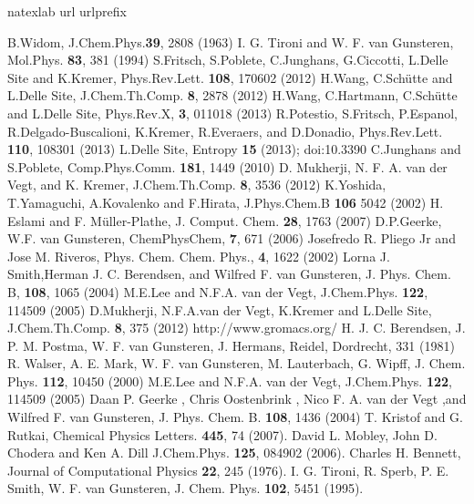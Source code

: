 \documentclass[a4paper,preprint,unsortedaddress]{revtex4-1}
\begin{document}
\begin{thebibliography}{24}
\expandafter\ifx\csname natexlab\endcsname\relax\def\natexlab#1{#1}\fi
\expandafter\ifx\csname url\endcsname\relax
  \def\url#1{\texttt{#1}}\fi
\expandafter\ifx\csname urlprefix\endcsname\relax\def\urlprefix{URL }\fi

B.Widom, J.Chem.Phys.{\bf 39}, 2808 (1963)
I. G. Tironi and W. F. van Gunsteren, Mol.Phys. {\bf 83}, 381 (1994)
S.Fritsch, S.Poblete, C.Junghans, G.Ciccotti, L.Delle Site and K.Kremer, Phys.Rev.Lett. {\bf 108}, 170602 (2012)
H.Wang, C.Sch\"{u}tte and L.Delle Site, J.Chem.Th.Comp. {\bf 8}, 2878 (2012)
H.Wang, C.Hartmann, C.Sch\"{u}tte and L.Delle Site, Phys.Rev.X, {\bf 3}, 011018 (2013)
R.Potestio, S.Fritsch, P.Espanol, R.Delgado-Buscalioni, K.Kremer, R.Everaers, and D.Donadio, Phys.Rev.Lett. {\bf 110}, 108301 (2013)
L.Delle Site, Entropy {\bf 15} (2013); doi:10.3390
C.Junghans and S.Poblete, Comp.Phys.Comm. {\bf 181}, 1449 (2010)
D. Mukherji, N. F. A. van der Vegt, and K. Kremer, J.Chem.Th.Comp. {\bf 8}, 3536 (2012)
K.Yoshida, T.Yamaguchi, A.Kovalenko and F.Hirata, J.Phys.Chem.B {\bf 106} 5042 (2002)
H. Eslami and F. M\"{u}ller-Plathe, J. Comput. Chem. {\bf 28}, 1763 (2007)
D.P.Geerke, W.F. van Gunsteren, ChemPhysChem, {\bf 7}, 671 (2006)
Josefredo R. Pliego Jr and Jose  M. Riveros, Phys. Chem. Chem. Phys., {\bf 4}, 1622 (2002)
Lorna J. Smith,Herman J. C. Berendsen, and Wilfred F. van Gunsteren, J. Phys. Chem. B, {\bf 108}, 1065 (2004)
M.E.Lee and N.F.A. van der Vegt, J.Chem.Phys. {\bf 122}, 114509 (2005)
D.Mukherji, N.F.A.van der Vegt, K.Kremer and L.Delle Site, J.Chem.Th.Comp. {\bf 8}, 375 (2012)
http://www.gromacs.org/
H. J. C. Berendsen, J. P. M. Postma, W. F. van Gunsteren, J. Hermans, Reidel, Dordrecht, 331 (1981)
R. Walser, A. E. Mark, W. F. van Gunsteren, M. Lauterbach, G. Wipff, J. Chem. Phys. {\bf 112}, 10450 (2000)
M.E.Lee and N.F.A. van der Vegt, J.Chem.Phys. {\bf 122}, 114509 (2005)
Daan P. Geerke , Chris Oostenbrink , Nico F. A. van der Vegt ,and Wilfred F. van Gunsteren, J. Phys. Chem. B. {\bf 108}, 1436 (2004)
T. Kristof and G. Rutkai, Chemical Physics Letters. {\bf 445}, 74 (2007). 
David L. Mobley, John D. Chodera and Ken A. Dill  J.Chem.Phys. {\bf 125}, 084902 (2006).
Charles H. Bennett, Journal of Computational Physics {\bf 22}, 245 (1976).
I. G. Tironi, R. Sperb, P. E. Smith, W. F. van Gunsteren, J. Chem. Phys. {\bf 102}, 5451 (1995).
\end{thebibliography}
\end{document}
